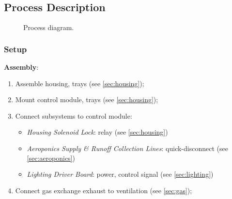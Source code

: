 \subsection{Process Description}
\label{sec:process}

\begin{figure}[h!]
    \centering
    \caption{Process diagram.}
    \label{fig:process}
\end{figure}

\clearpage

\subsubsection{Setup}
\label{sec:process_setup}

\textbf{Assembly}:
\begin{enumerate}
    \item Assemble housing, trays (see \ref{sec:housing});
    \item Mount control module, trays (see \ref{sec:housing});
    \item Connect subsystems to control module:
    \begin{itemize}
        \item \textit{Housing Solenoid Lock}: relay (see \ref{sec:housing})
        \item \textit{Aeroponics Supply \& Runoff Collection Lines}: quick-disconnect (see \ref{sec:aeroponics})
        \item \textit{Lighting Driver Board}: power, control signal (see \ref{sec:lighting})
    \end{itemize}
    \item Connect gas exchange exhaust to ventilation (see \ref{sec:gas});
\end{enumerate}


